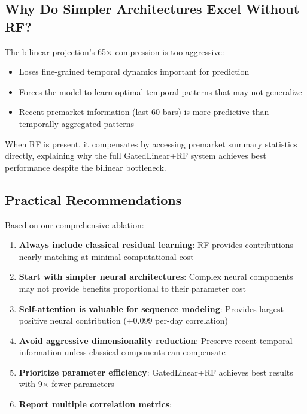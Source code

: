 \documentclass[10pt,conference]{IEEEtran}
\newcommand{\rev}[1]{#1}
\begin{document}
\subsection{Why Do Simpler Architectures Excel Without RF?}

The bilinear projection's 65$\times$ compression is too aggressive:

\begin{itemize}
    \item Loses fine-grained temporal dynamics important for prediction
    \item Forces the model to learn optimal temporal patterns that may not generalize
    \item Recent premarket information (last 60 bars) is more predictive than temporally-aggregated patterns
\end{itemize}

When RF is present, it compensates by accessing premarket summary statistics directly, explaining why the full GatedLinear+RF system achieves best performance despite the bilinear bottleneck.

\subsection{Practical Recommendations}

Based on our comprehensive ablation:

\begin{enumerate}
    \item \textbf{Always include classical residual learning}: RF provides \rev{contributions nearly matching} at minimal computational cost
    \item \textbf{Start with simpler neural architectures}: Complex neural components may not provide benefits proportional to their parameter cost
    \item \textbf{Self-attention is valuable for sequence modeling}: Provides largest \rev{positive} neural contribution (+\rev{0.099 per-day} correlation)
    \item \textbf{Avoid aggressive dimensionality reduction}: Preserve recent temporal information unless classical components can compensate
    \item \textbf{Prioritize parameter efficiency}: GatedLinear+RF achieves best results with 9$\times$ fewer parameters
    \item \rev{\textbf{Report multiple correlation metrics}: }
\end{enumerate}
\end{document}
